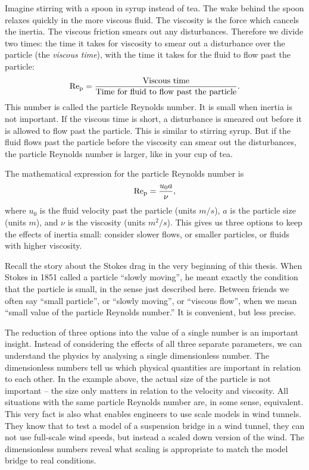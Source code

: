 \documentclass[thesis.tex]{subfiles}
\begin{document}
Imagine stirring with a spoon in syrup instead of tea. The wake behind the spoon relaxes quickly in the more viscous fluid. The viscosity is the force which cancels the inertia. The viscous friction smears out any disturbances. Therefore we divide two times: the time it takes for viscosity to smear out a disturbance over the particle (the \emph{viscous time}), with the time it takes for the fluid to flow past the particle:
\begin{align*}
\mbox{Re}_{\mathrm p} = \frac{\textrm{Viscous time}}{\textrm{Time for fluid to flow past the particle}}.
\end{align*} 
This number is called the particle Reynolds number. It is small when inertia is not important.
If the viscous time is short, a disturbance is smeared out before it is allowed to flow past the particle. This is similar to stirring syrup. But if the fluid flows past the particle before the viscosity can smear out the disturbances, the particle Reynolds number is larger, like in your cup of tea.

The mathematical expression for the particle Reynolds number is 
\begin{align*}
	\mbox{Re}_{\mathrm p} = \frac{u_0 a}{\nu},
\end{align*}
where $u_0$ is the fluid velocity past the particle (units $\unit{m/s}$), $a$ is the particle size (units $\unit{m}$), and $\nu$ is the viscosity (units $\unit{m^2/s}$). This gives us three options to keep the effects of inertia small: consider slower flows, or smaller particles, or fluids with higher viscosity.  

Recall the story about the Stokes drag in the very beginning of this thesis. When Stokes in 1851 called a particle ``slowly moving'', he meant exactly the condition that the particle is small, in the sense just described here. Between friends we often say ``small particle'', or ``slowly moving'', or ``viscous flow'', when we mean ``small value of the particle Reynolds number.'' It is convenient, but less precise.

The reduction of three options into the value of a single number is an important insight. Instead of considering the effects of all three separate parameters, we can understand the physics by analysing a single dimensionless number. The dimensionless numbers tell us which physical quantities are important in relation to each other. In the example above, the actual size of the particle is not important -- the size only matters in relation to the velocity and viscosity. All situations with the same particle Reynolds number are, in some sense, equivalent. This very fact is also what enables engineers to use scale models in wind tunnels. They know that to test a model of a suspension bridge in a wind tunnel, they can not use full-scale wind speeds, but instead a scaled down version of the wind. The dimensionless numbers reveal what scaling is appropriate to match the model bridge to real conditions.
\end{document}
